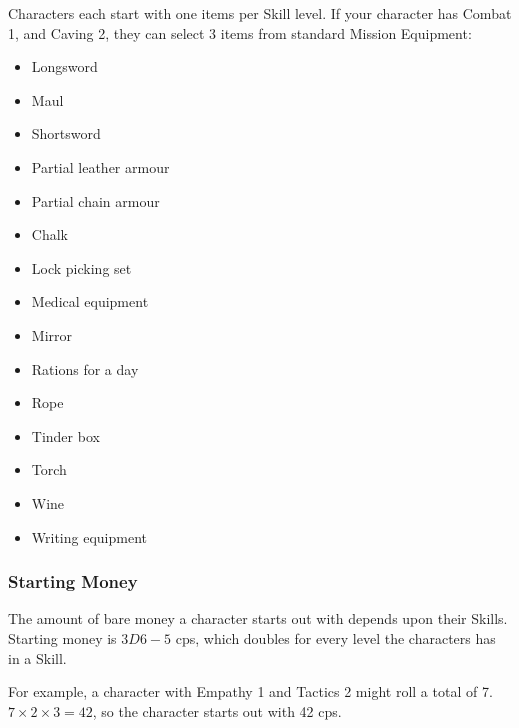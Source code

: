 \begin{multicols}{2}

Characters each start with one items per Skill level.
If your character has Combat 1, and Caving 2, they can select 3 items from standard Mission Equipment:

\begin{multicols}{2}
\begin{itemize}
\raggedright

  \item
  Longsword
  \item
  Maul
  \item
  Shortsword
  \item
  Partial leather armour
  \item
  Partial chain armour
  \item
  Chalk
  \item
  Lock picking set
  \item
  Medical equipment
  \item
  Mirror
  \item
  Rations for a day
  \item
  Rope
  \item
  Tinder box
  \item
  Torch
  \item
  Wine
  \item
  Writing equipment

\end{itemize}
\end{multicols}

\subsubsection{Starting Money}

The amount of bare money a character starts out with depends upon their Skills.
Starting money is $3D6-5$ \glspl{cp}, which doubles for every level the characters has in a Skill.

For example, a character with Empathy 1 and Tactics 2 might roll a total of 7.
$7\times2\times3 = 42$, so the character starts out with 42 \glspl{cp}.

\end{multicols}

